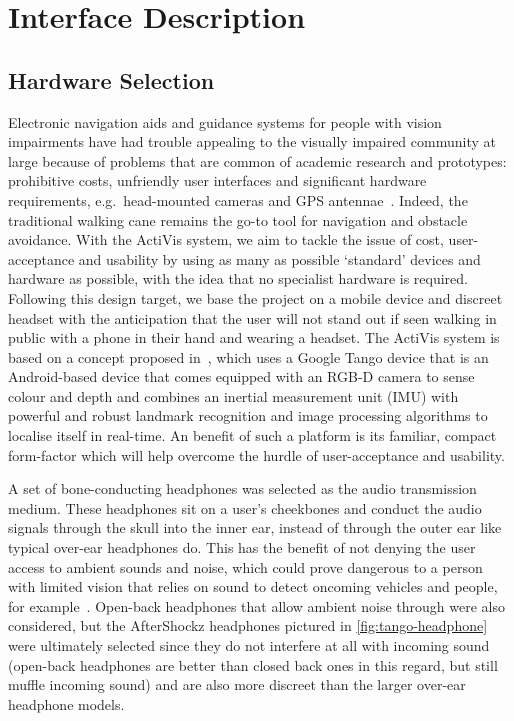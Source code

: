 \documentclass{llncs}
\begin{document}
\section{Interface Description}\label{sec:interface-design}

\subsection{Hardware Selection}

Electronic navigation aids and guidance systems for people with vision impairments have had trouble appealing to the visually impaired community at large because of problems that are common of academic research and prototypes: prohibitive costs, unfriendly user interfaces and significant hardware requirements, e.g.\ head-mounted cameras and GPS antennae~\cite{golledge2004stated,yusif2016older,arditi2013user}.
Indeed, the traditional walking cane remains the go-to tool for navigation and obstacle avoidance. 
With the ActiVis system, we aim to tackle the issue of cost, user-acceptance and usability by using as many as possible `standard' devices and hardware as possible, with the idea that no specialist hardware is required.
Following this design target, we base the project on a mobile device and discreet headset with the anticipation that the user will not stand out if seen walking in public with a phone in their hand and wearing a headset.
The ActiVis system is based on a concept proposed in~\cite{bellotto2013multimodal,lock2017portable}, which uses a Google Tango device that is an Android-based device that comes equipped with an RGB-D camera to sense colour and depth and combines an inertial measurement unit (IMU) with powerful and robust landmark recognition and image processing algorithms to localise itself in real-time.
An benefit of such a platform is its familiar, compact form-factor which will help overcome the hurdle of user-acceptance and usability.

A set of bone-conducting headphones was selected as the audio transmission medium.
These headphones sit on a user's cheekbones and conduct the audio signals through the skull into the inner ear, instead of through the outer ear like typical over-ear headphones do. 
This has the benefit of not denying the user access to ambient sounds and noise, which could prove dangerous to a person with limited vision that relies on sound to detect oncoming vehicles and people, for example~\cite{lichtenstein2012headphone}.
Open-back headphones that allow ambient noise through were also considered, but the AfterShockz headphones pictured in \cref{fig:tango-headphone} were ultimately selected since they do not interfere at all with incoming sound (open-back headphones are better than closed back ones in this regard, but still muffle incoming sound) and are also more discreet than the larger over-ear headphone models. 
\end{document}
